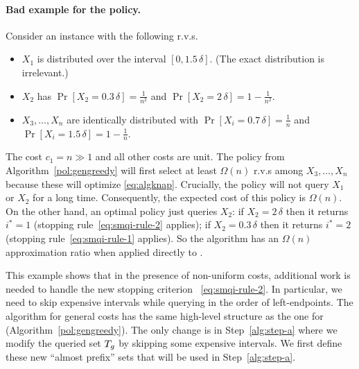 \documentclass[11pt]{article}
\theoremstyle{remark}
\theoremstyle{plain}
\theoremstyle{remark}
\begin{document}
\paragraph{Bad example for the \smq policy.} Consider an instance with the following r.v.s.
\begin{itemize}
    \item $X_1$ is distributed over the interval $[0,1.5\,\delta]$. (The exact distribution is irrelevant.)
    \item $X_2$ has    $\Pr[X_2=0.3\,\delta] =\frac1{n^2} $ and $\Pr[X_2=2\,\delta] =1-\frac1{n^2}$.
    \item $X_3,\dots, X_n$ are identically distributed with $\Pr[X_i=0.7\,\delta] = \frac1n $ and $\Pr[X_i=1.5\,\delta] = 1-\frac1n $.
\end{itemize}
The cost $c_1=n\gg 1$ and all other costs are unit. The \smq policy from Algorithm~\ref{pol:gengreedy} will first select at least $\Omega(n)$ r.v.s among $X_3,\dots, X_n$ because these will optimize \eqref{eq:algknap}. Crucially, the policy will not query $X_1$ or $X_2$ for a long time. Consequently, the expected cost of this policy is $\Omega(n)$. On the other hand, an optimal policy just  queries $X_2$: if $X_2=2\,
\delta$ then it returns $i^*=1$ (stopping rule~\eqref{eq:smqi-rule-2} applies); if $X_2=0.3\,\delta$ then it returns $i^*=2$ (stopping rule~\eqref{eq:smqi-rule-1} applies). So the \smq algorithm has an $\Omega(n)$ approximation ratio when applied directly to \smqi. 


This example shows that in the presence of non-uniform  costs,  additional work is needed to handle the new stopping criterion ~\eqref{eq:smqi-rule-2}. In particular, we need to skip  expensive intervals while querying in the order of left-endpoints. The \smqi algorithm for general costs has the same high-level structure as the one for \smq  (Algorithm~\ref{pol:gengreedy}). The only change is in Step~\ref{alg:step-a} where we modify the queried set $T_g$ 
by skipping some expensive intervals. We first define these new ``almost prefix'' sets that will be used in  Step~\ref{alg:step-a}.  
\end{document}

